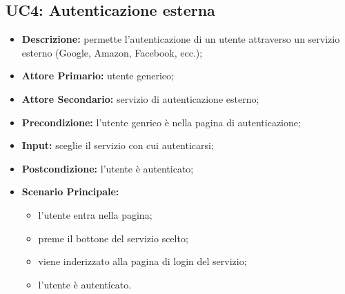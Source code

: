 \subsection{UC4: Autenticazione esterna}
\label{sec:UC4}
\begin{itemize}
    \item \textbf{Descrizione:} permette l'autenticazione di un utente attraverso un servizio esterno (Google, Amazon, Facebook, ecc.);
    \item \textbf{Attore Primario:} utente generico;
    \item \textbf{Attore Secondario:} servizio di autenticazione esterno;
    \item \textbf{Precondizione:} l'utente genrico è nella pagina di autenticazione;
    \item \textbf{Input:} sceglie il servizio con cui autenticarsi;
    \item \textbf{Postcondizione:} l'utente è autenticato;
    \item \textbf{Scenario Principale:}
          \begin{itemize}
              \item l'utente entra nella pagina;
              \item preme il bottone del servizio scelto;
              \item viene inderizzato alla pagina di login del servizio;
              \item l'utente è autenticato.
          \end{itemize}
\end{itemize}